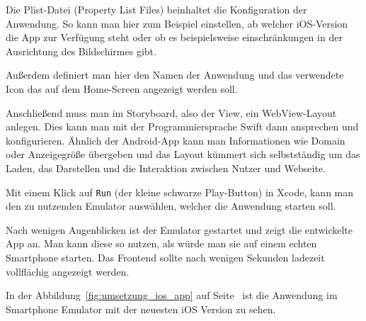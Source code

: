 Die Plist-Datei (Property List Files) beinhaltet die Konfiguration der Anwendung. So kann man hier zum Beispiel
einstellen, ab welcher iOS-Version die App zur Verfügung steht oder ob es beispielsweise einschränkungen in der
Ausrichtung des Bildschirmes gibt.

Außerdem definiert man hier den Namen der Anwendung und das verwendete Icon das auf dem Home-Screen angezeigt werden
soll.

Anschließend muss man im Storyboard, also der View, ein WebView-Layout anlegen. Dies kann man mit der Programmiersprache
Swift dann ansprechen und konfigurieren. Ähnlich der Android-App kann man Informationen wie Domain oder Anzeigegröße
übergeben und das Layout kümmert sich selbstständig um das Laden, das Darstellen und die Interaktion zwischen Nutzer und
Webseite.

Mit einem Klick auf \texttt{Run} (der kleine schwarze Play-Button) in Xcode, kann man den zu nutzenden Emulator
auswählen, welcher die Anwendung starten soll.

Nach wenigen Augenblicken ist der Emulator gestartet und zeigt die entwickelte App an. Man kann diese so nutzen, als
würde man sie auf einem echten Smartphone starten. Das Frontend sollte nach wenigen Sekunden ladezeit vollflächig
angezeigt werden.

In der Abbildung~\ref{fig:umsetzung_ios_app} auf Seite~\pageref{fig:umsetzung_ios_app} ist die Anwendung im Smartphone
Emulator mit der neuesten iOS Version zu sehen.

